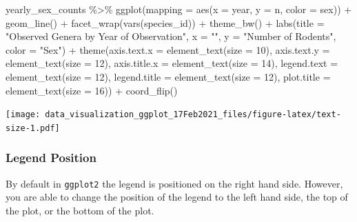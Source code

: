 \documentclass[
]{article}
\newenvironment{Shaded}{\begin{snugshade}}{\end{snugshade}}
\newcommand{\AttributeTok}[1]{\textcolor[rgb]{0.77,0.63,0.00}{#1}}
\newcommand{\DecValTok}[1]{\textcolor[rgb]{0.00,0.00,0.81}{#1}}
\newcommand{\FunctionTok}[1]{\textcolor[rgb]{0.00,0.00,0.00}{#1}}
\newcommand{\NormalTok}[1]{#1}
\newcommand{\SpecialCharTok}[1]{\textcolor[rgb]{0.00,0.00,0.00}{#1}}
\newcommand{\StringTok}[1]{\textcolor[rgb]{0.31,0.60,0.02}{#1}}
\begin{document}
\begin{Shaded}
\begin{Highlighting}[]
\NormalTok{yearly\_sex\_counts }\SpecialCharTok{\%\textgreater{}\%} 
  \FunctionTok{ggplot}\NormalTok{(}\AttributeTok{mapping =} \FunctionTok{aes}\NormalTok{(}\AttributeTok{x =}\NormalTok{ year, }\AttributeTok{y =}\NormalTok{ n, }\AttributeTok{color =}\NormalTok{ sex)) }\SpecialCharTok{+}
  \FunctionTok{geom\_line}\NormalTok{() }\SpecialCharTok{+}
  \FunctionTok{facet\_wrap}\NormalTok{(}\FunctionTok{vars}\NormalTok{(species\_id)) }\SpecialCharTok{+}
  \FunctionTok{theme\_bw}\NormalTok{() }\SpecialCharTok{+}
  \FunctionTok{labs}\NormalTok{(}\AttributeTok{title =} \StringTok{"Observed Genera by Year of Observation"}\NormalTok{,}
       \AttributeTok{x =} \StringTok{""}\NormalTok{,}
       \AttributeTok{y =} \StringTok{"Number of Rodents"}\NormalTok{, }
       \AttributeTok{color =} \StringTok{"Sex"}\NormalTok{) }\SpecialCharTok{+}
  \FunctionTok{theme}\NormalTok{(}\AttributeTok{axis.text.x =} \FunctionTok{element\_text}\NormalTok{(}\AttributeTok{size =} \DecValTok{10}\NormalTok{), }
        \AttributeTok{axis.text.y =} \FunctionTok{element\_text}\NormalTok{(}\AttributeTok{size =} \DecValTok{12}\NormalTok{), }
        \AttributeTok{axis.title.x =} \FunctionTok{element\_text}\NormalTok{(}\AttributeTok{size =} \DecValTok{14}\NormalTok{),}
        \AttributeTok{legend.text =} \FunctionTok{element\_text}\NormalTok{(}\AttributeTok{size =} \DecValTok{12}\NormalTok{),}
        \AttributeTok{legend.title =} \FunctionTok{element\_text}\NormalTok{(}\AttributeTok{size =} \DecValTok{12}\NormalTok{),}
        \AttributeTok{plot.title =} \FunctionTok{element\_text}\NormalTok{(}\AttributeTok{size =} \DecValTok{16}\NormalTok{)) }\SpecialCharTok{+} 
  \FunctionTok{coord\_flip}\NormalTok{()}
\end{Highlighting}
\end{Shaded}

\texttt{[image: data\_visualization\_ggplot\_17Feb2021\_files/figure-latex/text-size-1.pdf]}

\hypertarget{legend-position}{%
\subsubsection{Legend Position}\label{legend-position}}

By default in \texttt{ggplot2} the legend is positioned on the right
hand side. However, you are able to change the position of the legend to
the left hand side, the top of the plot, or the bottom of the plot.
\end{document}
